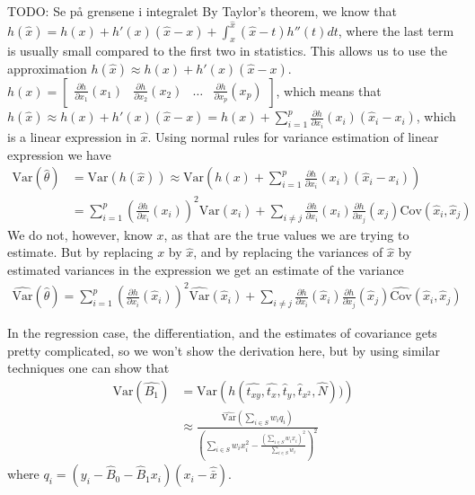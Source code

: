 \documentclass{article}
\begin{document}
TODO: Se på grensene i integralet
By Taylor's theorem, we know that \(h(\hat{x}) = h(x) + h'(x) (\hat{x} - x) + \int_x^{\hat{x}}  (\hat{x} -
t) h''(t) dt\), where the last term is usually small compared to the first two
in statistics. This allows us to use the approximation \(h(\hat{x}) \approx h(x) +
h'(x) (\hat{x} - x)\). \(h(x) = \begin{bmatrix} \frac{\partial h}{\partial x_1}
  (x_1) & \frac{\partial h}{\partial x_2} (x_2) & \dots & \frac{\partial
    h}{\partial x_p} (x_p)\end{bmatrix}\), which means that \(h(\hat{x}) \approx
h(x) + h'(x) (\hat{x} -
x) = h(x) + \sum_{i = 1}^p \frac{\partial h}{\partial x_i} (x_i) \left( \hat{x}_i - x_i
\right)\), which is a linear expression in \(\hat{x}\). Using normal rules for
variance estimation of linear expression we have
\begin{align*}
  \mathrm{Var} \left( \hat{\theta} \right)
  &= \mathrm{Var} \left( h(\hat{x}) \right)
  \approx \mathrm{Var} \left( h(x) + \sum_{i = 1}^p \frac{\partial h}{\partial x_i} (x_i) \left( \hat{x}_i - x_i
    \right) \right) \\
    &= \sum_{i = 1}^p \left( \frac{\partial h}{\partial x_i} (x_i)  \right)^2 \mathrm{Var} \left( \hat{x}_i \right) + \sum_{i \neq j}  \frac{\partial h}{\partial x_i} (x_i)  \frac{\partial h}{\partial x_j} (x_j)  \mathrm{Cov} \left( \hat{x}_i, \hat{x}_j \right)
\end{align*}
We do not, however, know \(x\), as that are the true values we are trying to
estimate. But by replacing \(x\) by \(\hat{x}\), and by replacing the variances
of \(\hat{x}\) by estimated variances in the expression we get an
estimate of the variance
\begin{align*}
  \widehat{\mathrm{Var}} \left( \hat{\theta} \right)
  = \sum_{i = 1}^p \left( \frac{\partial h}{\partial x_i} (\hat{x}_i)  \right)^2 \widehat{\mathrm{Var}} \left( \hat{x}_i \right) + \sum_{i \neq j}  \frac{\partial h}{\partial x_i} (\hat{x}_i)  \frac{\partial h}{\partial x_j} (\hat{x}_j)  \widehat{\mathrm{Cov}} \left( \hat{x}_i, \hat{x}_j \right)
\end{align*}

In the regression case, the differentiation, and the estimates of covariance
gets pretty complicated, so we won't show the derivation here, but by using
similar techniques one can show that
\begin{align*}
 \mathrm{Var}(\hat{B_1})
 &= \mathrm{Var} \left( h(\hat{t_{xy}}, \hat{t_x},
 \hat{t}_y, \hat{t}_{x^2}, \hat{N})) \right) \\
 &\approx \frac{\widehat{\mathrm{Var}}\left( \sum_{i \in S} w_i q_i \right)}
   {\left( \sum_{i \in S} w_i x_i^2 - \frac{\left( \sum_{i \in S} w_i x_i \right)^2}{\sum_{i \in S} w_i} \right)^2}
\end{align*}
where \(q_i = (y_i - \hat{B}_0 - \hat{B}_1 x_i)(x_i - \hat{\bar{x}})\).
\end{document}
